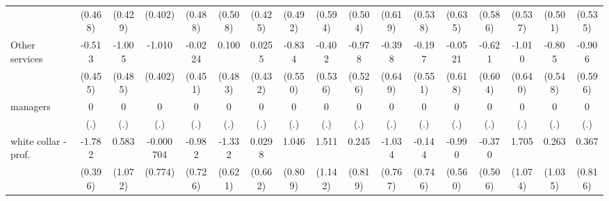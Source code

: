 {\begin{tabular}{l*{16}{c}}
                    &     (0.468)         &     (0.429)         &     (0.402)         &     (0.488)         &     (0.508)         &     (0.425)         &     (0.492)         &     (0.594)         &     (0.504)         &     (0.619)         &     (0.538)         &     (0.635)         &     (0.586)         &     (0.537)         &     (0.501)         &     (0.535)         \\
[1em]
Other services      &      -0.513         &      -1.005\sym{*}  &      -1.010\sym{*}  &     -0.0224         &       0.100         &      0.0255         &      -0.834         &      -0.402         &      -0.978         &      -0.398         &      -0.197         &     -0.0521         &      -0.621         &      -1.010         &      -0.805         &      -0.906         \\
                    &     (0.455)         &     (0.485)         &     (0.402)         &     (0.451)         &     (0.483)         &     (0.432)         &     (0.550)         &     (0.536)         &     (0.526)         &     (0.649)         &     (0.551)         &     (0.618)         &     (0.604)         &     (0.640)         &     (0.548)         &     (0.596)         \\
[1em]
managers            &           0         &           0         &           0         &           0         &           0         &           0         &           0         &           0         &           0         &           0         &           0         &           0         &           0         &           0         &           0         &           0         \\
                    &         (.)         &         (.)         &         (.)         &         (.)         &         (.)         &         (.)         &         (.)         &         (.)         &         (.)         &         (.)         &         (.)         &         (.)         &         (.)         &         (.)         &         (.)         &         (.)         \\
[1em]
white collar - prof.&      -1.782\sym{***}&       0.583         &   -0.000704         &      -0.982         &      -1.332\sym{*}  &      0.0298         &       1.046         &       1.511         &       0.245         &      -1.034         &      -0.144         &      -0.990         &      -0.370         &       1.705         &       0.263         &       0.367         \\
                    &     (0.396)         &     (1.072)         &     (0.774)         &     (0.726)         &     (0.621)         &     (0.662)         &     (0.809)         &     (1.142)         &     (0.819)         &     (0.767)         &     (0.746)         &     (0.560)         &     (0.506)         &     (1.074)         &     (1.035)         &     (0.816)         \\

\end{tabular}}
